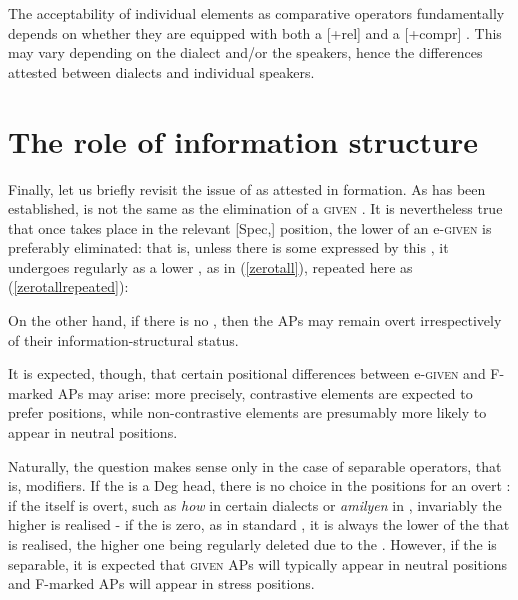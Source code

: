\largerpage[1]
The acceptability of individual elements as comparative operators fundamentally depends on whether they are equipped with both a [+rel] and a [+compr] . This may vary depending on the dialect and/or the speakers, hence the differences attested between dialects and individual speakers.

\section{The role of information structure} \label{sec:3role}
Finally, let us briefly revisit the issue of  as attested in  formation. As has been established,  is not the same as the elimination of a \textsc{given} . It is nevertheless true that once  takes place in the relevant [Spec,] position, the lower  of an e-\textsc{given}  is preferably eliminated: that is, unless there is some  expressed by this , it undergoes  regularly as a lower , as in (\ref{zerotall}), repeated here as (\ref{zerotallrepeated}):

 \label{zerotallrepeated}
\z

On the other hand, if there is no , then the APs may remain overt irrespectively of their information-structural status.

It is expected, though, that certain positional differences between e-\textsc{given} and F-marked APs may arise: more precisely, contrastive elements are expected to prefer  positions, while non-contrastive elements are presumably more likely to appear in neutral positions.

Naturally, the question makes sense only in the case of separable operators, that is,  modifiers. If the  is a Deg head, there is no choice in the positions for an overt : if the  itself is overt, such as \textit{how} in certain  dialects or \textit{amilyen} in , invariably the higher  is realised - if the  is zero, as in standard , it is always the lower  of the  that is realised, the higher one being regularly deleted due to the . However, if the  is separable, it is expected that \textsc{given} APs will typically appear in neutral positions and F-marked APs will appear in stress positions.

